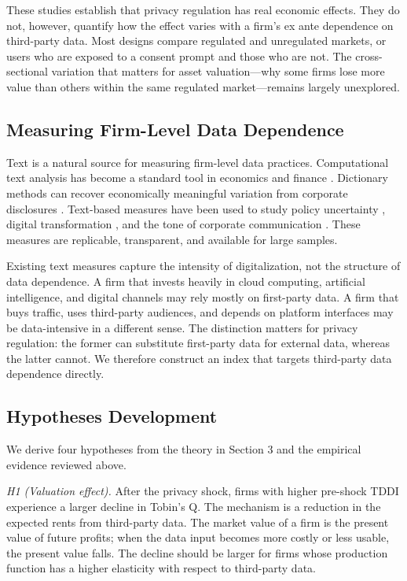 These studies establish that privacy regulation has real economic effects. They do not, however, quantify how the effect varies with a firm's ex ante dependence on third-party data. Most designs compare regulated and unregulated markets, or users who are exposed to a consent prompt and those who are not. The cross-sectional variation that matters for asset valuation—why some firms lose more value than others within the same regulated market—remains largely unexplored.

\subsection{Measuring Firm-Level Data Dependence}

Text is a natural source for measuring firm-level data practices. Computational text analysis has become a standard tool in economics and finance \cite{gentzkow2019}. Dictionary methods can recover economically meaningful variation from corporate disclosures \cite{loughran2011}. Text-based measures have been used to study policy uncertainty \cite{baker2016}, digital transformation \cite{jin2026}, and the tone of corporate communication \cite{loughran2011}. These measures are replicable, transparent, and available for large samples.

Existing text measures capture the intensity of digitalization, not the structure of data dependence. A firm that invests heavily in cloud computing, artificial intelligence, and digital channels may rely mostly on first-party data. A firm that buys traffic, uses third-party audiences, and depends on platform interfaces may be data-intensive in a different sense. The distinction matters for privacy regulation: the former can substitute first-party data for external data, whereas the latter cannot. We therefore construct an index that targets third-party data dependence directly.

\subsection{Hypotheses Development}

We derive four hypotheses from the theory in Section 3 and the empirical evidence reviewed above.

\textit{H1 (Valuation effect).} After the privacy shock, firms with higher pre-shock TDDI experience a larger decline in Tobin's Q. The mechanism is a reduction in the expected rents from third-party data. The market value of a firm is the present value of future profits; when the data input becomes more costly or less usable, the present value falls. The decline should be larger for firms whose production function has a higher elasticity with respect to third-party data.


